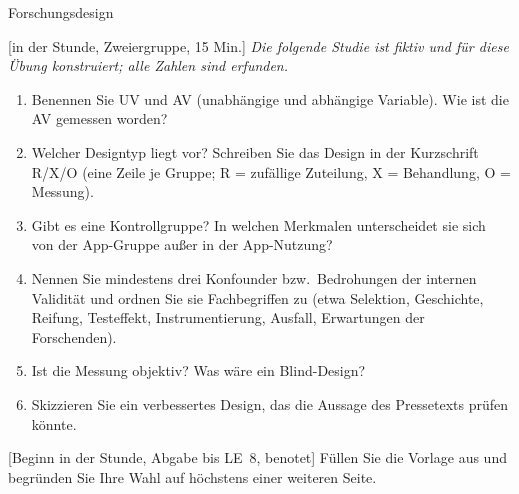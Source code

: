 \begin{uebungsblatt}{Forschungsdesign}

[in der Stunde, Zweiergruppe, 15 Min.]
\textit{Die folgende Studie ist fiktiv und für diese Übung konstruiert;
alle Zahlen sind erfunden.}

\begin{center}
\end{center}

\begin{enumerate}
  \item Benennen Sie UV und AV (unabhängige und abhängige Variable). Wie
    ist die AV gemessen worden?
  \item Welcher Designtyp liegt vor? Schreiben Sie das Design in der
    Kurzschrift R/X/O (eine Zeile je Gruppe; R = zufällige Zuteilung,
    X = Behandlung, O = Messung).
  \item Gibt es eine Kontrollgruppe? In welchen Merkmalen unterscheidet
    sie sich von der App-Gruppe außer in der App-Nutzung?
  \item Nennen Sie mindestens drei Konfounder bzw.\ Bedrohungen der
    internen Validität und ordnen Sie sie Fachbegriffen zu (etwa Selektion,
    Geschichte, Reifung, Testeffekt, Instrumentierung, Ausfall,
    Erwartungen der Forschenden).
  \item Ist die Messung objektiv? Was wäre ein Blind-Design?
  \item Skizzieren Sie ein verbessertes Design, das die Aussage des
    Pressetexts prüfen könnte.
\end{enumerate}

[Beginn in der Stunde, Abgabe bis LE~8, benotet]
Füllen Sie die Vorlage aus und begründen Sie Ihre Wahl auf höchstens einer
weiteren Seite.


\end{uebungsblatt}

